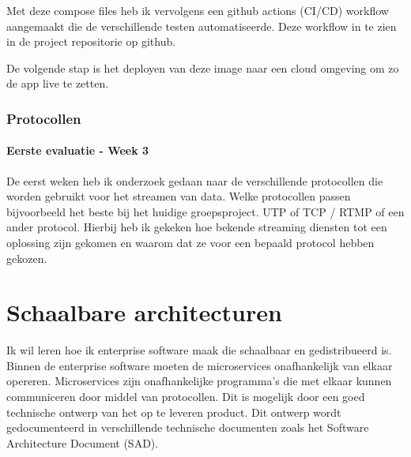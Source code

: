 Met deze compose files heb ik vervolgens een github actions (CI/CD) workflow aangemaakt die de verschillende testen automatiseerde.
Deze workflow in te zien in de project repositorie op github.

De volgende stap is het deployen van deze image naar een cloud omgeving om zo de app live te zetten.

\subsubsection{Protocollen}\label{subsec:protocollen}
\paragraph{Eerste evaluatie - Week 3}
De eerst weken heb ik onderzoek gedaan naar de verschillende protocollen die worden gebruikt voor het streamen
van data.
Welke protocollen passen bijvoorbeeld het beste bij het huidige groepsproject.
UTP of TCP / RTMP of een ander protocol.
Hierbij heb ik gekeken hoe bekende streaming diensten tot een oplossing zijn gekomen en waarom dat ze voor een
bepaald protocol hebben gekozen.


\section{Schaalbare architecturen}\label{sec:schaalbare-architecturen}


Ik wil leren hoe ik enterprise software maak die schaalbaar en gedistribueerd is.
Binnen de enterprise software moeten de microservices onafhankelijk van elkaar opereren.
Microservices zijn onafhankelijke programma's die met elkaar kunnen communiceren door middel van protocollen.
Dit is mogelijk door een goed technische ontwerp van het op te leveren product.
Dit ontwerp wordt gedocumenteerd in verschillende technische documenten zoals het Software Architecture Document (SAD).

